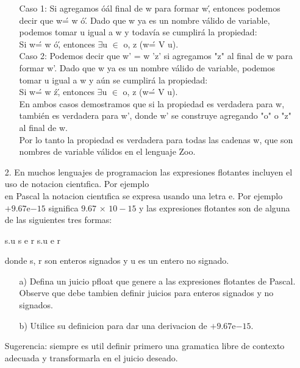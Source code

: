 \documentclass{article}
\begin{document}
\begin{itemize}
\begin{itemize}
                Caso 1: Si agregamos \'o\' al final de w para formar w\', entonces podemos decir que w\' = w \'o\'. Dado que w ya es un nombre válido de variable, podemos tomar u igual a w y todavía se cumplirá la propiedad:\\

                Si w\' = w \'o\', entonces $\exists$u $\in$ o, z (w\' = V u).\\

                Caso 2: Podemos decir que w' = w 'z' si agregamos "z" al final de w para formar w'. Dado que w ya es un nombre válido de variable, podemos tomar u igual a w y aún se cumplirá la propiedad:\\ 

                Si w\' = w \'z\', entonces $\exists$u $\in$ o, z (w\' = V u).\\

                En ambos casos demostramos que si la propiedad es verdadera para w, también es verdadera para w', donde w' se construye agregando "o" o "z" al final de w.\\

                Por lo tanto la propiedad es verdadera para todas las cadenas w, que son nombres de variable válidos en el lenguaje Zoo.
            \end{itemize} 
        \item[2.] En muchos lenguajes de programacion las expresiones flotantes incluyen el uso de notacion cientıfica. Por ejemplo\\
        en Pascal la notacion cientıfica se expresa usando una letra e. Por ejemplo $+9.67$e$-15$ significa $9.67$ × $10-15$ y las expresiones flotantes son de alguna de las siguientes tres formas:
            \begin{center}
                s.u s e r s.u e r
            \end{center}
        donde s, r son enteros signados y u es un entero no signado.
            \begin{itemize}
                \item[a)] Defina un juicio pfloat que genere a las expresiones flotantes de Pascal. Observe que debe tambien definir juicios para enteros signados y no signados.
                \item[b)] Utilice su definicion para dar una derivacion de $+9.67$e$-15$.
            \end{itemize}
        Sugerencia: siempre es util definir primero una gramatica libre de contexto adecuada y transformarla en el juicio deseado.


\end{itemize}
\end{document}
